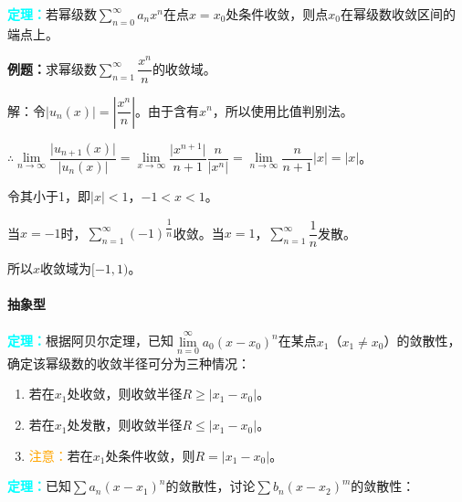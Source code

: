\documentclass[UTF8, 12pt]{ctexart}
\begin{document}
        \textcolor{aqua}{\textbf{定理：}}若幂级数$\sum\limits_{n=0}^\infty a_nx^n$在点$x=x_0$处条件收敛，则点$x_0$在幂级数收敛区间的端点上。

        \textbf{例题：}求幂级数$\sum\limits_{n=1}^\infty\dfrac{x^n}{n}$的收敛域。

        解：令$\vert u_n(x)\vert=\left\vert\dfrac{x^n}{n}\right\vert$。由于含有$x^n$，所以使用比值判别法。

        $\therefore\lim\limits_{n\to\infty}\dfrac{\vert u_{n+1}(x)\vert}{\vert u_n(x)\vert}=\lim\limits_{x\to\infty}\dfrac{\vert x^{n+1}\vert}{n+1}\dfrac{n}{\vert x^n\vert}=\lim\limits_{n\to\infty}\dfrac{n}{n+1}\vert x\vert=\vert x\vert$。\medskip

        令其小于1，即$\vert x\vert<1$，$-1<x<1$。

        当$x=-1$时，$\sum\limits_{n=1}^\infty(-1)^\dfrac{1}{n}$收敛。当$x=1$，$\sum\limits_{n=1}^\infty\dfrac{1}{n}$发散。

        所以$x$收敛域为$[-1,1)$。

        \paragraph{抽象型} \leavevmode \medskip

        \textcolor{aqua}{\textbf{定理：}}根据阿贝尔定理，已知$\lim\limits_{n=0}^\infty a_0(x-x_0)^n$在某点$x_1$（$x_1\neq x_0$）的敛散性，确定该幂级数的收敛半径可分为三种情况：

        \begin{enumerate}
            \item 若在$x_1$处收敛，则收敛半径$R\geqslant\vert x_1-x_0\vert$。
            \item 若在$x_1$处发散，则收敛半径$R\leqslant\vert x_1-x_0\vert$。
            \item \textcolor{orange}{注意：}若在$x_1$处条件收敛，则$R=\vert x_1-x_0\vert$。
        \end{enumerate}

        \textcolor{aqua}{\textbf{定理：}}已知$\sum a_n(x-x_1)^n$的敛散性，讨论$\sum b_n(x-x_2)^m$的敛散性：
\end{document}
